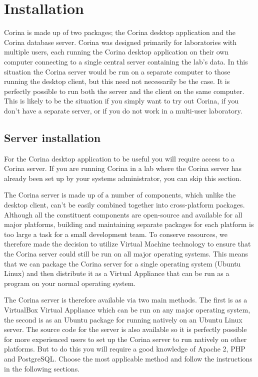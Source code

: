 
\chapter{Installation}
\label{txt:installation}
Corina is made up of two packages; the Corina desktop application and the Corina database server.  Corina was designed primarily for laboratories with multiple users, each running the Corina desktop application on their own computer connecting to a single central server containing the lab's data.  In this situation the Corina server would be run on a separate computer to those running the desktop client, but this need not necessarily be the case.  It is perfectly possible to run both the server and the client on the same computer.  This is likely to be the situation if you simply want to try out Corina, if you don't have a separate server, or if you do not work in a multi-user laboratory.


\section{Server installation}
For the Corina desktop application to be useful you will require access to a Corina server.  If you are running Corina in a lab where the Corina server has already been set up by your systems administrator, you can skip this section.

The Corina server is made up of a number of components, which unlike the desktop client, can't be easily combined together into cross-platform packages.  Although all the constituent components are open-source and available for all major platforms, building and maintaining separate packages for each platform is too large a task for a small development team.  To conserve resources, we therefore made the decision to utilize Virtual Machine technology to ensure that the Corina server could still be run on all major operating systems.  This means that we can package the Corina server for a single operating system (Ubuntu Linux) and then distribute it as a Virtual Appliance that can be run as a program on your normal operating system. 

The Corina server is therefore available via two main methods.  The first is as a VirtualBox Virtual Appliance which can be run on any major operating system, the second is as an Ubuntu package for running natively on an Ubuntu Linux server.  The source code for the server is also available so it is perfectly possible for more experienced users to set up the Corina server to run natively on other platforms.  But to do this you will require a good knowledge of Apache 2, PHP and PostgreSQL.  Choose the most applicable method and follow the instructions in the following sections.

